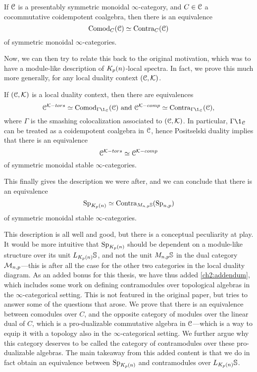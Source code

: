 \begin{theorem}
    If $\EuScript{C}$ is a presentably symmetric monoidal $\infty$-category, and $C\in \EuScript{C}$ a cocommutative coidempotent coalgebra, then there is an equivalence 
    \[\mathrm{Comod}_C(\EuScript{C})\simeq \mathrm{Contra}_C(\EuScript{C})\]
    of symmetric monoidal $\infty$-categories. 
\end{theorem}

Now, we can then try to relate this back to the original motivation, which was to have a module-like description of ${K_p(n)}$-local spectra. In fact, we prove this much more generally, for any local duality context $(\EuScript{C}, \mathcal{K})$. 

\begin{theorem}
    If $(\EuScript{C}, \mathcal{K})$ is a local duality context, then there are equivalences 
    \[\C^{\K-tors}\simeq \Comod_{\Gamma \1_\C}(\C) \text{ and } \C^{\K-comp}\simeq \Contra_{\Gamma \1_\C}(\C),\]
    where $\Gamma$ is the smashing colocalization associated to $(\EuScript{C}, \mathcal{K})$. In particular, $\Gamma \1_\C$ can be treated as a coidempotent coalgebra in $\EuScript{C}$, hence Positselski duality implies that there is an equivalence 
    \[\EuScript{C}^{\mathcal{K}-tors}\simeq \EuScript{C}^{\mathcal{K}-comp}\]
    of symmetric monoidal stable $\infty$-categories. 
\end{theorem}

This finally gives the description we were after, and we can conclude that there is an equivalence 
\[\mathrm{Sp}_{K_p(n)} \simeq \mathrm{Contra}_{M_{n,p} \mathbb{S}}(\mathrm{Sp}_{n,p})\]
of symmetric monoidal stable $\infty$-categories. 

This description is all well and good, but there is a conceptual peculiarity at play. It would be more intuitive that $\mathrm{Sp}_{K_p(n)}$ should be dependent on a module-like structure over its unit $L_{K_p(n)} \mathbb{S}$, and not the unit $M_{n,p} \mathbb{S}$ in the dual category $\mathcal{M}_{n,p}$---this is after all the case for the other two categories in the local duality diagram. As an added bonus for this thesis, we have thus added \cref{ch2:addendum}, which includes some work on defining contramodules over topological algebras in the $\infty$-categorical setting. This is not featured in the original paper, but tries to answer some of the questions that arose. We prove that there is an equivalence between comodules over $C$, and the opposite category of modules over the linear dual of $C$, which is a pro-dualizable commutative algebra in $\EuScript{C}$---which is a way to equip it with a topology also in the $\infty$-categorical setting. We further argue why this category deserves to be called the category of contramodules over these pro-dualizable algebras. The main takeaway from this added content is that we do in fact obtain an equivalence between $\mathrm{Sp}_{{K_p(n)}}$ and contramodules over $L_{K_p(n)}\mathbb{S}$. 










